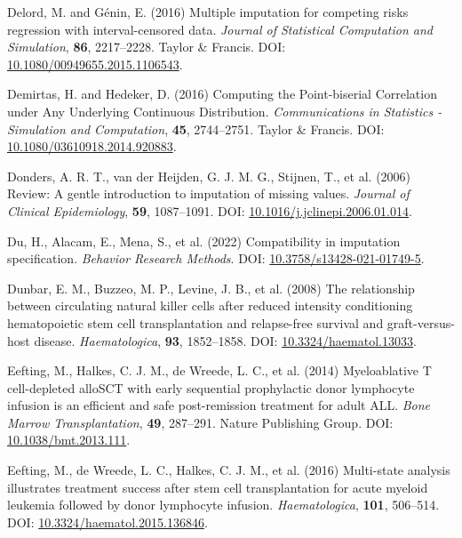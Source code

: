 \documentclass[
  letterpaper,
  DIV=11,
  numbers=noendperiod]{scrreprt}
\newlength{\cslhangindent}
\newenvironment{CSLReferences}[2] %
 {\begin{list}{}{%
  \setlength{\itemindent}{0pt}
  \setlength{\leftmargin}{0pt}
  \setlength{\parsep}{0pt}
  \ifodd #1
   \setlength{\leftmargin}{\cslhangindent}
   \setlength{\itemindent}{-1\cslhangindent}
  \fi
  \setlength{\itemsep}{#2\baselineskip}}}
 {\end{list}}
\begin{document}
\begin{CSLReferences}{1}{1}
Delord, M. and Génin, E. (2016) Multiple imputation for competing risks
regression with interval-censored data. \emph{Journal of Statistical
Computation and Simulation}, \textbf{86}, 2217--2228. Taylor \& Francis.
DOI:
\href{https://doi.org/10.1080/00949655.2015.1106543}{10.1080/00949655.2015.1106543}.

Demirtas, H. and Hedeker, D. (2016) Computing the {Point-biserial
Correlation} under {Any Underlying Continuous Distribution}.
\emph{Communications in Statistics - Simulation and Computation},
\textbf{45}, 2744--2751. Taylor \& Francis. DOI:
\href{https://doi.org/10.1080/03610918.2014.920883}{10.1080/03610918.2014.920883}.

Donders, A. R. T., van der Heijden, G. J. M. G., Stijnen, T., et al.
(2006) Review: {A} gentle introduction to imputation of missing values.
\emph{Journal of Clinical Epidemiology}, \textbf{59}, 1087--1091. DOI:
\href{https://doi.org/10.1016/j.jclinepi.2006.01.014}{10.1016/j.jclinepi.2006.01.014}.

Du, H., Alacam, E., Mena, S., et al. (2022) Compatibility in imputation
specification. \emph{Behavior Research Methods}. DOI:
\href{https://doi.org/10.3758/s13428-021-01749-5}{10.3758/s13428-021-01749-5}.

Dunbar, E. M., Buzzeo, M. P., Levine, J. B., et al. (2008) The
relationship between circulating natural killer cells after reduced
intensity conditioning hematopoietic stem cell transplantation and
relapse-free survival and graft-versus-host disease.
\emph{Haematologica}, \textbf{93}, 1852--1858. DOI:
\href{https://doi.org/10.3324/haematol.13033}{10.3324/haematol.13033}.

Eefting, M., Halkes, C. J. M., de Wreede, L. C., et al. (2014)
Myeloablative {T} cell-depleted {alloSCT} with early sequential
prophylactic donor lymphocyte infusion is an efficient and safe
post-remission treatment for adult {ALL}. \emph{Bone Marrow
Transplantation}, \textbf{49}, 287--291. Nature Publishing Group. DOI:
\href{https://doi.org/10.1038/bmt.2013.111}{10.1038/bmt.2013.111}.

Eefting, M., de Wreede, L. C., Halkes, C. J. M., et al. (2016)
Multi-state analysis illustrates treatment success after stem cell
transplantation for acute myeloid leukemia followed by donor lymphocyte
infusion. \emph{Haematologica}, \textbf{101}, 506--514. DOI:
\href{https://doi.org/10.3324/haematol.2015.136846}{10.3324/haematol.2015.136846}.


\end{CSLReferences}
\end{document}
